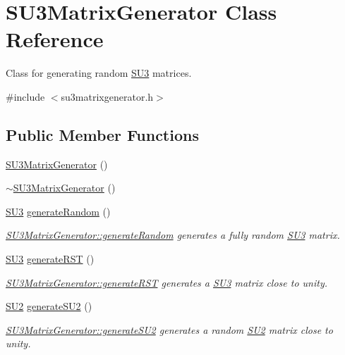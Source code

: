 \hypertarget{class_s_u3_matrix_generator}{}\section{S\+U3\+Matrix\+Generator Class Reference}
\label{class_s_u3_matrix_generator}


Class for generating random \mbox{\hyperlink{class_s_u3}{S\+U3}} matrices.  




{\ttfamily \#include $<$su3matrixgenerator.\+h$>$}

\subsection*{Public Member Functions}
\begin{DoxyCompactItemize}
\item 
\mbox{\hyperlink{class_s_u3_matrix_generator_ae76a62a4ba6af03901a0cc8e8632e856}{S\+U3\+Matrix\+Generator}} ()
\item 
\mbox{\hyperlink{class_s_u3_matrix_generator_a58195e1974eed39db617eaea50778f47}{$\sim$\+S\+U3\+Matrix\+Generator}} ()
\item 
\mbox{\hyperlink{class_s_u3}{S\+U3}} \mbox{\hyperlink{class_s_u3_matrix_generator_a06dc59b5a86ba6863b848ef1ca26629a}{generate\+Random}} ()
\begin{DoxyCompactList}\small\item\em \mbox{\hyperlink{class_s_u3_matrix_generator_a06dc59b5a86ba6863b848ef1ca26629a}{S\+U3\+Matrix\+Generator\+::generate\+Random}} generates a fully random \mbox{\hyperlink{class_s_u3}{S\+U3}} matrix. \end{DoxyCompactList}\item 
\mbox{\hyperlink{class_s_u3}{S\+U3}} \mbox{\hyperlink{class_s_u3_matrix_generator_a478a6d34a643f4ee30bc333ca1023b00}{generate\+R\+ST}} ()
\begin{DoxyCompactList}\small\item\em \mbox{\hyperlink{class_s_u3_matrix_generator_a478a6d34a643f4ee30bc333ca1023b00}{S\+U3\+Matrix\+Generator\+::generate\+R\+ST}} generates a \mbox{\hyperlink{class_s_u3}{S\+U3}} matrix close to unity. \end{DoxyCompactList}\item 
\mbox{\hyperlink{class_s_u2}{S\+U2}} \mbox{\hyperlink{class_s_u3_matrix_generator_aa4e04caff654a1df7c43280b85f359bc}{generate\+S\+U2}} ()
\begin{DoxyCompactList}\small\item\em \mbox{\hyperlink{class_s_u3_matrix_generator_aa4e04caff654a1df7c43280b85f359bc}{S\+U3\+Matrix\+Generator\+::generate\+S\+U2}} generates a random \mbox{\hyperlink{class_s_u2}{S\+U2}} matrix close to unity. \end{DoxyCompactList}\item 

\end{DoxyCompactItemize}
